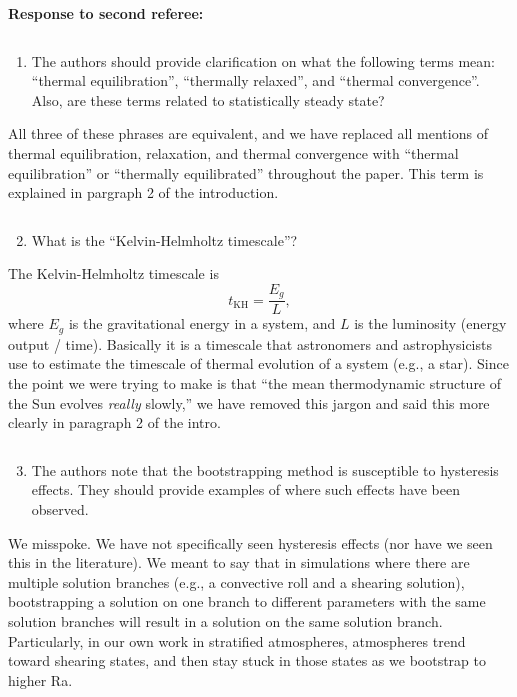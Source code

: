\documentclass[aps, 11pt, singlecolumn]{revtex4-1} %
\begin{document}
\begin{singlespace}
\newpage
\noindent
\Large{\textbf{Response to second referee:}}\newline$\,$\newline\indent
\begin{myquotation}
$\,$\\\vspace{-1.25cm}
\begin{enumerate}
\item The authors should provide clarification on what the following terms mean: ``thermal equilibration'', ``thermally relaxed'', and ``thermal convergence''. Also, are these terms related to statistically steady state?
\end{enumerate}
\end{myquotation}
All three of these phrases are equivalent, and we have replaced all mentions of
thermal equilibration, relaxation, and thermal convergence with ``thermal
equilibration'' or ``thermally equilibrated'' throughout the paper. This term
is explained in pargraph 2 of the introduction.
\begin{myquotation}
$\,$\\\vspace{-1.25cm}
\begin{enumerate}
\setcounter{enumi}{1}
\item What is the ``Kelvin-Helmholtz timescale''?
\end{enumerate}
\end{myquotation}
The Kelvin-Helmholtz timescale is 
$$
t_{\text{KH}} = \frac{E_g}{L},
$$
where $E_g$ is the gravitational energy in a system, and $L$ is the luminosity
(energy output / time). Basically it is a timescale that astronomers and
astrophysicists use to estimate the timescale of thermal evolution of a system 
(e.g., a star). Since the point we were trying to make is that ``the mean 
thermodynamic structure of the Sun evolves \emph{really} slowly,''
we have removed this jargon and said this more clearly in paragraph 2 of the intro.

\begin{myquotation}
$\,$\\\vspace{-1.25cm}
\begin{enumerate}
\setcounter{enumi}{2}
\item The authors note that the bootstrapping method is susceptible to hysteresis effects. They should provide examples of where such effects have been observed.
\end{enumerate}
\end{myquotation}
We misspoke. We have not specifically seen hysteresis effects (nor have we seen
this in the literature).  We meant to say that in simulations where there are
multiple solution branches (e.g., a convective roll and a shearing solution),
bootstrapping a solution on one branch to different parameters with the same
solution branches will result in a solution on the 
same solution branch. Particularly, in our own
work in stratified atmospheres, atmospheres trend toward shearing states, and then
stay stuck in those states as we bootstrap to higher Ra.


\end{singlespace}
\end{document}
